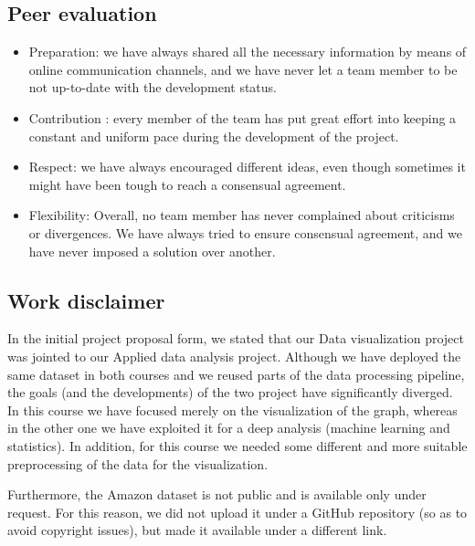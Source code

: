 \documentclass[a4paper,12pt]{article}
\begin{document}
\subsection{Peer evaluation}
\begin{itemize}
	\item Preparation: we have always shared all the necessary information by means of online communication channels, and we have never let a team member to be not up-to-date with the development status.
	\item Contribution : every member of the team has put great effort into keeping a constant and uniform pace during the development of the project.
	\item Respect: we have always encouraged different ideas, even though sometimes it might have been tough to reach a consensual agreement. 
	\item Flexibility: Overall, no team member has never complained about criticisms or divergences. We have always tried to ensure consensual agreement, and we have never imposed a solution over another.
\end{itemize}

\subsection{Work disclaimer}
In the initial project proposal form, we stated that our Data visualization project was jointed to our Applied data analysis project. Although we have deployed the same dataset in both courses and we reused parts of the data processing pipeline, the goals (and the developments) of the two project have significantly diverged. In this course we have focused merely on the visualization of the graph, whereas in the other one we have exploited it for a deep analysis (machine learning and statistics). In addition, for this course we needed some different and more suitable preprocessing of the data for the visualization.

Furthermore, the Amazon dataset is not public and is available only under request. For this reason, we did not upload it under a GitHub repository (so as to avoid copyright issues), but made it available under a different link.
\end{document}
